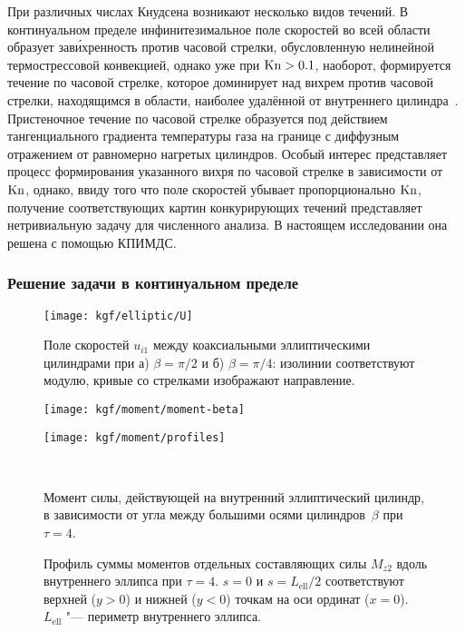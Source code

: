 При различных числах Кнудсена возникают несколько видов течений.
В континуальном пределе инфинитезимальное поле скоростей во всей области образует зав\'{и}хренность против часовой стрелки,
обусловленную нелинейной термострессовой конвекцией,
однако уже при \(\mathrm{Kn}>0.1\), наоборот, формируется течение по часовой стрелке,
которое доминирует над вихрем против часовой стрелки, находящимся в области,
наиболее удалённой от внутреннего цилиндра~\cite{Sone1998}.
Пристеночное течение по часовой стрелке образуется под действием тангенциального градиента температуры газа
на границе с диффузным отражением от равномерно нагретых цилиндров.
Особый интерес представляет процесс формирования указанного вихря по часовой стрелке
в зависимости от \(\mathrm{Kn}\), однако, ввиду того что поле скоростей убывает пропорционально \(\mathrm{Kn}\),
получение соответствующих картин конкурирующих течений представляет нетривиальную задачу
для численного анализа. В настоящем исследовании она решена с помощью КПИМДС.

\subsubsection{Решение задачи в континуальном пределе}

\begin{figure}
    \centering
    \texttt{[image: kgf/elliptic/U]}
    \caption{Поле скоростей \(u_{i1}\) между коаксиальными эллиптическими цилиндрами
        при а) \(\beta = \pi/2\) и б) \(\beta = \pi/4\):
        изолинии соответствуют модулю, кривые со стрелками изображают направление.}
    \label{fig:elliptic}
\end{figure}

\begin{figure}[ht]
    \parbox[t]{0.48\linewidth}{%
        \centering
        \texttt{[image: kgf/moment/moment-beta]}
    }\hfill
    \parbox[t]{0.48\linewidth}{%
        \centering
        \texttt{[image: kgf/moment/profiles]}
    }\\[-6pt]
    \parbox[t]{0.48\linewidth}{%
        \caption{Момент силы, действующей на внутренний эллиптический цилиндр,
            в зависимости от угла между большими осями цилиндров~\(\beta\) при \(\tau=4\).}
        \label{fig:elliptic:beta}
    }\hfill
    \parbox[t]{0.48\linewidth}{%
        \caption{Профиль суммы моментов отдельных составляющих силы \(M_{z2}\) вдоль внутреннего эллипса при \(\tau=4\).
            \(s=0\) и \(s=L_\mathrm{ell}/2\) соответствуют верхней (\(y>0\)) и нижней (\(y<0\)) точкам на оси ординат (\(x=0\)).
            \(L_\mathrm{ell}\) "--- периметр внутреннего эллипса.}
        \label{fig:elliptic:profiles}
    }
\end{figure}

